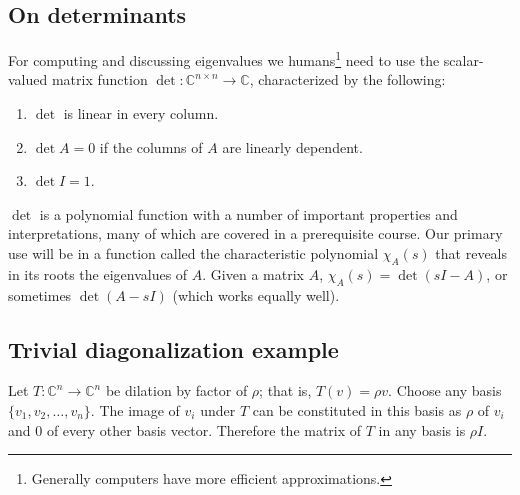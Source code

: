 \subsection{On determinants}
For computing and discussing eigenvalues we humans\footnote{Generally computers have more efficient approximations.} need to use the scalar-valued matrix function \(\det: \mathbb{C}^{n\times n} \to \mathbb{C}\), characterized by the following:
\begin{enumerate}
  \item \(\det\) is linear in every column.
  \item \(\det A = 0\) if the columns of \(A\) are linearly dependent.
  \item \(\det I = 1\).
\end{enumerate}
\(\det\) is a polynomial function with a number of important properties and interpretations, many of which are covered in a prerequisite course.
Our primary use will be in a function called the characteristic polynomial \(\chi_A(s)\) that reveals in its roots the eigenvalues of \(A\).
Given a matrix \(A\), \(\chi_A(s) = \det(sI - A)\), or sometimes \(\det(A -sI)\) (which works equally well).



\subsection{Trivial diagonalization example}
Let \(T: \mathbb{C}^n \to \mathbb{C}^n\) be dilation by factor of \(\rho\);
that is, \(T(v) = \rho v\).
Choose any basis \(\{v_1, v_2, \ldots, v_n\}\).
The image of \(v_i\) under \(T\) can be constituted in this basis as \(\rho\) of \(v_i\) and 0 of every other basis vector.
Therefore the matrix of \(T\) in any basis is \(\rho I\).

